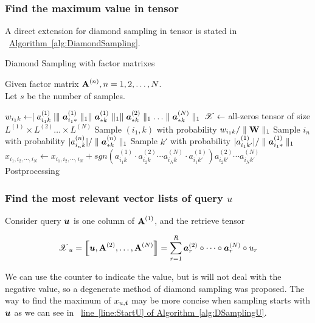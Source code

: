 \documentclass{article}
\newcommand{\Sca}[3]{{#1}^{(#2)}_{i_#2#3}}%
\newcommand{\T}[1]{\boldsymbol{\mathscr{\MakeUppercase{#1}}}}%
\newcommand{\V}[1]{{\bm{{\MakeLowercase{#1}}}}}%
\newcommand{\VnC}[3]{\V{#1}^{(#2)}_{#3}}%
\newcommand{\Varow}[1]{\V{a}^{(#1)}_{i_#1*}}
\newcommand{\Vacol}[1]{\V{a}^{(#1)}_{*k}}
\newcommand{\M}[1]{{\bm{\mathbf{\MakeUppercase{#1}}}}}%
\newcommand{\Mn}[2]{\M{#1}^{(#2)}}%
\newcommand{\norm}[2]{\parallel#1\parallel_{#2}}
\newcommand{\Alg}[1]{\hyperref[alg:#1]{Algorithm~\ref*{alg:#1}}}
\newcommand{\AlgLine}[2]{\hyperref[alg:#1]{line~\ref*{line:#2} of Algorithm~\ref*{alg:#1}}}
\newcommand{\KT}[1]{\left\llbracket #1 \right\rrbracket}
\begin{document}
\subsubsection{Find the maximum value in tensor }
A direct extension for diamond sampling in tensor is stated in ~\Alg{DiamondSampling}.
\begin{algorithm}[t]
    \caption{Diamond Sampling with factor matrixes}
    \label{alg:DiamondSampling}
    Given factor matrix $\M{A}^{(n)}, n = 1,2,\ldots,N$.\\
    Let $s$ be the number of samples.
    \begin{algorithmic}[1]
    \For{all $\Sca{a}{1}{k} \neq 0$}
    \State $w_{i_1k} \leftarrow \mid \Sca{a}{1}{k}\mid
    \norm{\Varow{1}}{1}\norm{\Vacol{1}}{1}\norm{\Vacol{2}}{1}\ldots\norm{\Vacol{N}}{1} $
    \EndFor
    \State $\T{X} \leftarrow$ all-zeros tensor of size
    $L^{(1)}\times L^{(2)}\ldots\times L^{(N)}$
    \State Sample $(i_1,k)$ with probability $w_{i_1k}/\norm{\M{W}}{1}$
    \label{line:ik}
    \State Sample $i_n$ with probability $|\Sca{a}{n}{k}|/\norm{\Vacol{n}}{1}$
    \label{line:in}
    \EndFor
    \State Sample $k'$ with probability $|\Sca{a}{1}{k'}|/\norm{\Varow{1}}{1}$
    \label{line:kp}
    \State $x_{i_1,i_2,\cdots,i_N}\leftarrow x_{i_1,i_2,\cdots,i_N} +
    sgn(\Sca{a}{1}{k}\cdot\Sca{a}{2}{k}\cdots\Sca{a}{N}{k}\cdot\Sca{a}{1}{k'})
    \Sca{a}{2}{k'}\cdots\Sca{a}{N}{k'}$
    \EndFor\\
    Postprocessing
    \end{algorithmic}
\end{algorithm}
\subsubsection{Find the most relevant vector lists of query $u$}

Consider query $\V{u}$ is one column of $\M{a}^{(1)}$, and the retrieve tensor

\[
\T{X}_u= \KT{\V{U},\Mn{A}{2},\dots,\Mn{A}{N}} =
\sum_{r=1}^{R}\VnC{A}{2}{r} \circ \cdots \circ \VnC{A}{N}{r}\circ u_r
\]

We can use the counter to indicate the value, but is will not deal with the negative value, so a degenerate method of diamond sampling was proposed.
The way to find the maximum of $x_{u,\V{i}}$ may be more concise when sampling starts with $\V{U}$ as we can see in ~\AlgLine{DSamplingU}{StartU}.
\end{document}
